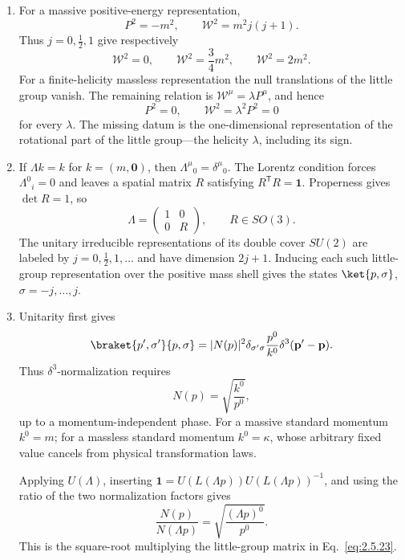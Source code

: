 \begin{enumerate}
\begin{enumerate}
\item
For a massive positive-energy representation,
\[
 P^2=-m^2,\qquad
 \mathcal W^2=m^2j(j+1).
\]
Thus \(j=0,\frac12,1\) give respectively
\[
 \mathcal W^2=0,\qquad
 \mathcal W^2=\frac34m^2,\qquad
 \mathcal W^2=2m^2.
\]
For a finite-helicity massless representation the null translations of
the little group vanish.  The remaining relation is
\(\mathcal W^\mu=\lambda P^\mu\), and hence
\[
 P^2=0,\qquad \mathcal W^2=\lambda^2P^2=0
\]
for every \(\lambda\).  The missing datum is the one-dimensional
representation of the rotational part of the little group---the helicity
\(\lambda\), including its sign.
\item
If \(\Lambda k=k\) for \(k=(m,\mathbf0)\), then
\(\Lambda^\mu{}_0=\delta^\mu{}_0\).  The Lorentz condition forces
\(\Lambda^0{}_i=0\) and leaves a spatial matrix \(R\) satisfying
\(R^{\mathsf T}R=\mathbf{1}\).  Properness gives \(\det R=1\), so
\[
 \Lambda=\begin{pmatrix}1&0\\0&R\end{pmatrix},
 \qquad R\in SO(3).
\]
The unitary irreducible representations of its double cover \(SU(2)\) are
labeled by \(j=0,\frac12,1,\ldots\) and have dimension \(2j+1\).  Inducing
each such little-group representation over the positive mass shell gives
the states \(\ket{p,\sigma}\), \(\sigma=-j,\ldots,j\).
\item
Unitarity first gives
\[
 \braket{p',\sigma'}{p,\sigma}
 =|N(p)|^2\delta_{\sigma'\sigma}
 \frac{p^0}{k^0}\delta^3(\mathbf p'-\mathbf p).
\]
Thus \(\delta^3\)-normalization requires
\[
 N(p)=\sqrt{\frac{k^0}{p^0}},
\]
up to a momentum-independent phase.  For a massive standard momentum
\(k^0=m\); for a massless standard momentum \(k^0=\kappa\), whose arbitrary
fixed value cancels from physical transformation laws.

Applying \(U(\Lambda)\), inserting
\(\mathbf{1}=U(L(\Lambda p))U(L(\Lambda p))^{-1}\), and using the ratio of
the two normalization factors gives
\[
 \frac{N(p)}{N(\Lambda p)}
 =\sqrt{\frac{(\Lambda p)^0}{p^0}}.
\]
This is the square-root multiplying the little-group matrix in
Eq.~\eqref{eq:2.5.23}.
\end{enumerate}


\end{enumerate}
